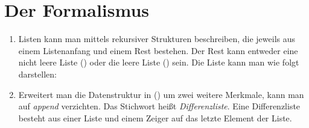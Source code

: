 \section{Der Formalismus}
\label{Abschnitt-Formalismus-Lösungen}\label{Seite-Lösungen-Listen}

\begin{enumerate}
\item Listen kann man mittels rekursiver Strukturen beschreiben, die jeweils aus einem Listenanfang
  und einem Rest bestehen. Der Rest kann entweder eine nicht leere Liste () oder die
  leere Liste () sein. Die Liste  kann man wie folgt darstellen:
\ea
{}
\z
\item Erweitert man die Datenstruktur in () um zwei weitere Merkmale, kann man auf
  \emph{append} verzichten. Das Stichwort heißt \emph{Differenzliste}. Eine Differenzliste besteht
  aus einer Liste und einem Zeiger auf das letzte Element der Liste. 
\ea
{}
\z


\end{enumerate}
